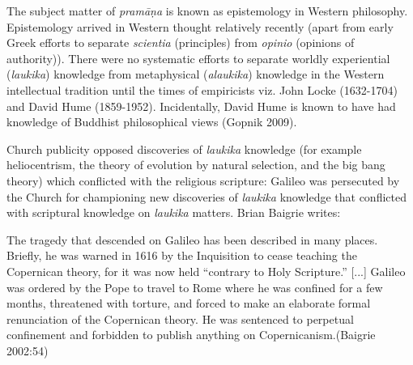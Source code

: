 The subject matter of {\sl pramāṇa} is known as epistemology in Western philosophy.  Epistemology arrived in Western thought relatively recently (apart from early Greek efforts to separate {\sl scientia} (principles) from {\sl opinio} (opinions of authority)). There were no systematic efforts to separate worldly experiential ({\sl laukika}) knowledge from metaphysical ({\sl alaukika}) knowledge in the Western intellectual tradition until the times of empiricists viz. John Locke (1632-1704) and David Hume (1859-1952).  Incidentally, David Hume is known to have had knowledge of Buddhist philosophical views (Gopnik 2009).

Church publicity opposed discoveries of {\sl laukika} knowledge (for example heliocentrism, the theory of evolution by natural selection, and the big bang theory) which conflicted with the religious scripture: Galileo was persecuted by the Church for championing new discoveries of {\sl laukika} knowledge that conflicted with scriptural knowledge on {\sl laukika} matters.  Brian Baigrie writes:
\begin{myquote}
The tragedy that descended on Galileo has been described in many places. Briefly, he was warned in 1616 by the Inquisition to cease teaching the Copernican theory, for it was now held ``contrary to Holy Scripture.'' [...] Galileo was ordered by the Pope to travel to Rome where he was confined for a few months, threatened with torture, and forced to make an elaborate formal renunciation of the Copernican theory.  He was sentenced to perpetual confinement and forbidden to publish anything on Copernicanism.\hfill (Baigrie 2002:54)
\end{myquote}


